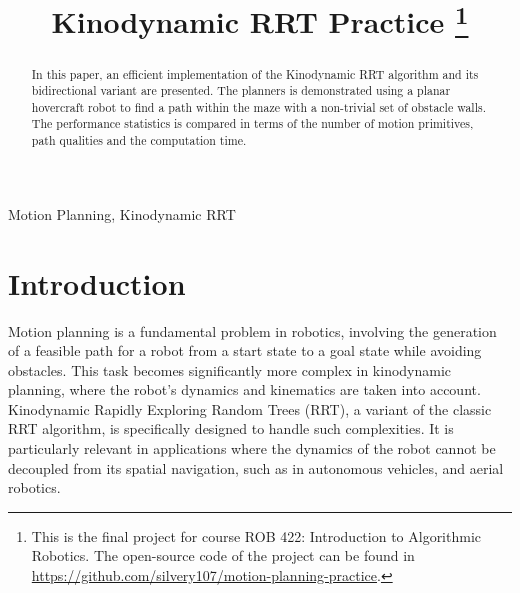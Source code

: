 \documentclass[11pt, conference]{IEEEtran}
\begin{document}
\title{Kinodynamic RRT Practice
\thanks{This is the final project for course ROB 422: Introduction to Algorithmic Robotics. The open-source code of the project can be found in  \href{https://github.com/silvery107/motion-planning-practice}{https://github.com/silvery107/motion-planning-practice}.}%
}

\author{
}

\maketitle

\begin{abstract}
In this paper, an efficient implementation of the Kinodynamic RRT algorithm and its bidirectional variant are presented. The planners is demonstrated using a planar hovercraft robot to find a path within the maze with a non-trivial set of obstacle walls. The performance statistics is compared in terms of the number of motion primitives, path qualities and the computation time.
\end{abstract}

\begin{IEEEkeywords}
Motion Planning, Kinodynamic RRT
\end{IEEEkeywords}


\section{Introduction}

Motion planning is a fundamental problem in robotics, involving the generation of a feasible path for a robot from a start state to a goal state while avoiding obstacles\cite{lavalle2006planning}. This task becomes significantly more complex in kinodynamic planning, where the robot's dynamics and kinematics are taken into account. Kinodynamic Rapidly Exploring Random Trees (RRT)\cite{lavalle2001randomized}, a variant of the classic RRT algorithm\cite{lavalle1998rapidly}, is specifically designed to handle such complexities. It is particularly relevant in applications where the dynamics of the robot cannot be decoupled from its spatial navigation, such as in autonomous vehicles, and aerial robotics.
\end{document}
